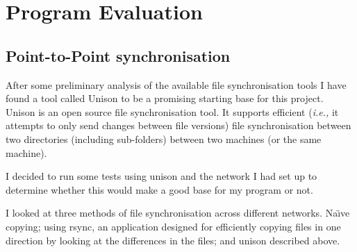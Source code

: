 \documentclass[12pt]{article}
\begin{document}
\section{Program Evaluation}
\subsection{Point-to-Point synchronisation}
After some preliminary analysis of the available file synchronisation
tools I have found a tool called Unison to be a promising starting
base for this project. Unison is an open source file synchronisation tool.
It supports efficient (\emph{i.e.,} it attempts to only send changes between file versions) file synchronisation between two
directories (including sub-folders) between two machines (or the same
machine).

I decided to run some tests using unison 
and the network
I had set up to determine whether this would make a good base for
my program or not.

I looked at three methods of file synchronisation across
different networks. Na\"{\i}ve copying; using rsync, an application
designed for efficiently copying files in one direction by looking at
the differences in the files; and unison described above.

\end{document}
